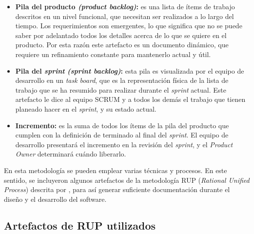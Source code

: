 			\begin{itemize}
				\item \textbf{Pila del producto \textit{(product backlog)}: }
					es una lista de \'{i}tems de trabajo descritos en un nivel funcional, que necesitan ser realizados a lo largo del tiempo. Los requerimientos son emergentes, lo que significa que no se puede saber por adelantado todos los detalles acerca de lo que se quiere en el producto. Por esta raz\'{o}n este artefacto es un documento din\'{a}mico, que requiere un refinamiento constante para mantenerlo actual y \'{u}til.
				
				\item \textbf{Pila del \textit{sprint} \textit{(sprint backlog)}: }
				esta pila es visualizada por el equipo de desarrollo en un \textit{task board}, que es la representaci\'{o}n f\'{i}sica de la lista de trabajo que se ha resumido para realizar durante el \textit{sprint} actual. Este artefacto le dice al equipo SCRUM y a todos los dem\'{a}s el trabajo que tienen planeado hacer en el \textit{sprint}, y su estado actual.
				
				\item \textbf{Incremento: }
				es la suma de todos los \'{i}tems de la pila del producto que cumplen con la definici\'{o}n de terminado al final del \textit{sprint}. El equipo de desarrollo presentar\'{a} el incremento en la revisi\'{o}n del \textit{sprint}, y el \textit{Product Owner} determinar\'{a} cu\'{a}ndo liberarlo.
				
			\end{itemize}
			
En esta metodolog\'{i}a se pueden emplear varias t\'{e}cnicas y procesos. En este sentido, se incluyeron algunos artefactos de la metodolog\'{i}a RUP (\textit{Rational Unified Process}) descrita por \cite{Kroll&Kruchten}, para as\'{i} generar suficiente documentaci\'{o}n durante el dise\~{n}o y el desarrollo del software. 

	\subsection{Artefactos de RUP utilizados}
	
